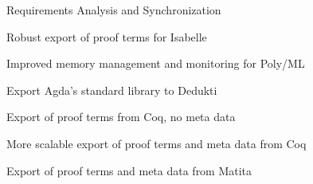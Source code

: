 \begin{workpackage}
\begin{tasklist}
\begin{task}[id=coq,title=Instrument Coq]

\end{task}
\end{tasklist}

\begin{wpdelivs}
  \begin{wpdeliv}[due=3,miles=startup,id=requirements,dissem=PU,nature=DEM,lead=Inr]
      {Requirements Analysis and Synchronization}
  \end{wpdeliv}
  \begin{wpdeliv}[due=12,miles=logipedia-v1,id=isabelle1,dissem=PU,nature=DEM,lead=Tum]
      {Robust export of proof terms for Isabelle}
  \end{wpdeliv}
  \begin{wpdeliv}[due=12,miles=logipedia-v1,id=isabelle1,dissem=PU,nature=DEM,lead=Tum]
      {Improved memory management and monitoring for Poly/ML}
  \end{wpdeliv}
  \begin{wpdeliv}[due=18,miles=agda-stdlib,id=agda,dissem=PU,nature=DEM,lead=Del]
      {Export Agda's standard library to Dedukti}
  \end{wpdeliv}
  \begin{wpdeliv}[due=8,miles=logipedia-v1,id=coq1,dissem=PU,nature=DEM,lead=Inr]
    {Export of proof terms from Coq, no meta data}
  \end{wpdeliv}
  \begin{wpdeliv}[due=24,miles=logipedia-v2,id=coq2,dissem=PU,nature=DEM,lead=Bol]
    {More scalable export of proof terms and meta data from Coq}
  \end{wpdeliv}
  \begin{wpdeliv}[due=12,miles=logipedia-v1,id=matita1,dissem=PU,nature=DEM,lead=Bol]
    {Export of proof terms and meta data from Matita}
  \end{wpdeliv}
\end{wpdelivs}
\end{workpackage}

